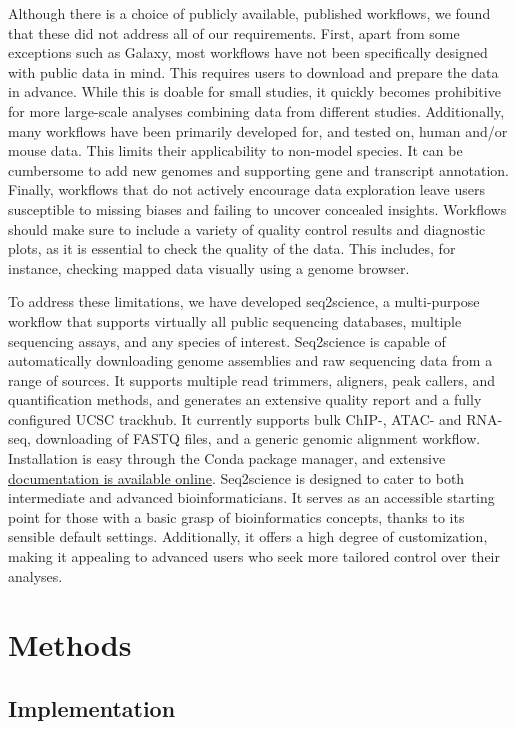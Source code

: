 Although there is a choice of publicly available, published workflows, we found that these did not address all of our requirements. First, apart from some exceptions such as Galaxy, most workflows have not been specifically designed with public data in mind. This requires users to download and prepare the data in advance. While this is doable for small studies, it quickly becomes prohibitive for more large-scale analyses combining data from different studies. Additionally, many workflows have been primarily developed for, and tested on, human and/or mouse data. This limits their applicability to non-model species. It can be cumbersome to add new genomes and supporting gene and transcript annotation. Finally, workflows that do not actively encourage data exploration leave users susceptible to missing biases and failing to uncover concealed insights. Workflows should make sure to include a variety of quality control results and diagnostic plots, as it is essential to check the quality of the data. This includes, for instance, checking mapped data visually using a genome browser. 

To address these limitations, we have developed seq2science, a multi-purpose workflow that supports virtually all public sequencing databases, multiple sequencing assays, and any species of interest. Seq2science is capable of automatically downloading genome assemblies and raw sequencing data from a range of sources. It supports multiple read trimmers, aligners, peak callers, and quantification methods, and generates an extensive quality report and a fully configured UCSC trackhub. It currently supports bulk ChIP-, ATAC- and RNA-seq, downloading of FASTQ files, and a generic genomic alignment workflow. Installation is easy through the Conda package manager, and extensive \href{https://vanheeringen-lab.github.io/seq2science/}{documentation is available online}. Seq2science is designed to cater to both intermediate and advanced bioinformaticians. It serves as an accessible starting point for those with a basic grasp of bioinformatics concepts, thanks to its sensible default settings. Additionally, it offers a high degree of customization, making it appealing to advanced users who seek more tailored control over their analyses.

\section{Methods}

\subsection{Implementation}

